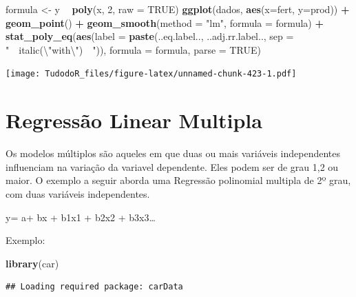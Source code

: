 \documentclass[
]{book}
\newenvironment{Shaded}{\begin{snugshade}}{\end{snugshade}}
\newcommand{\CharTok}[1]{\textcolor[rgb]{0.31,0.60,0.02}{#1}}
\newcommand{\DataTypeTok}[1]{\textcolor[rgb]{0.13,0.29,0.53}{#1}}
\newcommand{\DecValTok}[1]{\textcolor[rgb]{0.00,0.00,0.81}{#1}}
\newcommand{\KeywordTok}[1]{\textcolor[rgb]{0.13,0.29,0.53}{\textbf{#1}}}
\newcommand{\NormalTok}[1]{#1}
\newcommand{\OperatorTok}[1]{\textcolor[rgb]{0.81,0.36,0.00}{\textbf{#1}}}
\newcommand{\OtherTok}[1]{\textcolor[rgb]{0.56,0.35,0.01}{#1}}
\newcommand{\StringTok}[1]{\textcolor[rgb]{0.31,0.60,0.02}{#1}}
\begin{document}
\begin{Shaded}
\begin{Highlighting}[]
\NormalTok{ formula <-}\StringTok{ }\NormalTok{y }\OperatorTok{~}\StringTok{ }\KeywordTok{poly}\NormalTok{(x, }\DecValTok{2}\NormalTok{, }\DataTypeTok{raw =} \OtherTok{TRUE}\NormalTok{)}
 \KeywordTok{ggplot}\NormalTok{(dados, }\KeywordTok{aes}\NormalTok{(}\DataTypeTok{x=}\NormalTok{fert, }\DataTypeTok{y=}\NormalTok{prod)) }\OperatorTok{+}
\StringTok{   }\KeywordTok{geom_point}\NormalTok{() }\OperatorTok{+}
\StringTok{   }\KeywordTok{geom_smooth}\NormalTok{(}\DataTypeTok{method =} \StringTok{"lm"}\NormalTok{, }\DataTypeTok{formula =}\NormalTok{ formula) }\OperatorTok{+}
\StringTok{   }\KeywordTok{stat_poly_eq}\NormalTok{(}\KeywordTok{aes}\NormalTok{(}\DataTypeTok{label =}  \KeywordTok{paste}\NormalTok{(..eq.label.., ..adj.rr.label.., }
     \DataTypeTok{sep =} \StringTok{"~~italic(}\CharTok{\textbackslash{}"}\StringTok{with}\CharTok{\textbackslash{}"}\StringTok{)~~"}\NormalTok{)),}
     \DataTypeTok{formula =}\NormalTok{ formula, }\DataTypeTok{parse =} \OtherTok{TRUE}\NormalTok{)}
\end{Highlighting}
\end{Shaded}

\texttt{[image: TudodoR\_files/figure-latex/unnamed-chunk-423-1.pdf]}

\hypertarget{regressuxe3o-linear-multipla}{%
\section{Regressão Linear Multipla}\label{regressuxe3o-linear-multipla}}

Os modelos múltiplos são aqueles em que duas ou mais variáveis independentes influenciam na variação da variavel dependente. Eles podem ser de grau 1,2 ou maior. O exemplo a seguir aborda uma Regressão polinomial multipla de 2º grau, com duas variáveis independentes.

y= a+ bx + b1x1 + b2x2 + b3x3\ldots{}

Exemplo:

\begin{Shaded}
\begin{Highlighting}[]
\KeywordTok{library}\NormalTok{(car)}
\end{Highlighting}
\end{Shaded}

\begin{verbatim}
## Loading required package: carData
\end{verbatim}
\end{document}
